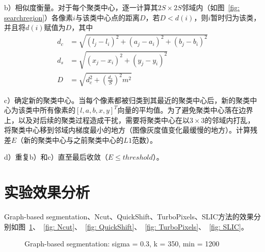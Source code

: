\documentclass[12pt]{article}
\begin{document}
b）相似度衡量。对于每个聚类中心，逐一计算其$2S \times 2S$邻域内（如图~\ref{fig: searchregion}）各像素$i$与该类中心点的距离$D$，若$D<d(i)$，则$i$暂时归为该类，并且将$d(i)$赋值为$D$，其中
\begin{align}
d_c & =  \sqrt{(l_j-l_i)^2+(a_j-a_i)^2+(b_j-b_i)^2}\\
d_s & =  \sqrt{(x_j-x_i)^2+(y_j-y_i)^2}\\
D & =  \sqrt{d_c^2+\left(\frac{d_s}{S}\right)^2m^2}
\end{align}

c）确定新的聚类中心。当每个像素都被归类到其最近的聚类中心后，新的聚类中心为该类中所有像素的$[l, a, b, x, y]^T$向量的平均值。为了避免聚类中心落在边界上，以及对后续的聚类过程造成干扰，需要将聚类中心在以$3\times3$的邻域内打乱，将聚类中心移到邻域内梯度最小的地方（图像灰度值变化最缓慢的地方）。计算残差$E$（新的聚类中心与之前聚类中心的$L1$范数）。

d）重复b）和c）直至最后收敛（$E\le threshold$）。

\section{实验效果分析}

Graph-based segmentation、Ncut、QuickShift、TurboPixels、SLIC方法的效果分别如图~\ref{fig: GB}、~\ref{fig: Ncut}、~\ref{fig: QuickShift}、~\ref{fig: TurboPixels}、~\ref{fig: SLIC}。

\begin{figure}
  \centering 
  \caption{Graph-based segmentation: sigma = 0.3, k = 350, min = 1200}
  \label{fig: GB} %
\end{figure}
\end{document}
